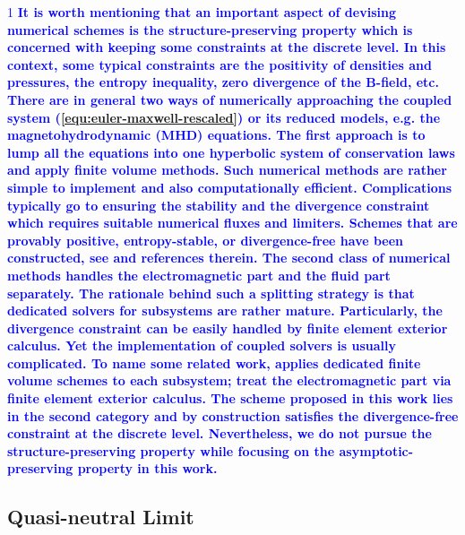 \documentclass{article}
\def\ifUpdate{1}
\newcommand{\review}[1]{\textcolor{blue}{\if\ifUpdate1\textbf{#1}\fi}}
\begin{document}
\review{
It is worth mentioning that an important aspect of devising numerical schemes is the structure-preserving property which is concerned with keeping some constraints at the discrete level. In this context, some typical constraints are the positivity of densities and pressures, the entropy inequality, zero divergence of the $\mathbf{B}$-field, etc. There are in general two ways of numerically approaching the coupled system (\ref{equ:euler-maxwell-rescaled}) or its reduced models, e.g. the magnetohydrodynamic (MHD) equations. The first approach is to lump all the equations into one hyperbolic system of conservation laws and apply finite volume methods. Such numerical methods are rather simple to implement and also computationally efficient. Complications typically go to ensuring the stability and the divergence constraint which requires suitable numerical fluxes and limiters. Schemes that are provably positive, entropy-stable, or divergence-free have been constructed, see \cite{wu_2018, wu_2023a, wu_2023b, kumar_2011, fuchs_2009} and references therein. The second class of numerical methods handles the electromagnetic part and the fluid part separately. The rationale behind such a splitting strategy is that dedicated solvers for subsystems are rather mature. Particularly, the divergence constraint can be easily handled by finite element exterior calculus. Yet the implementation of coupled solvers is usually complicated. To name some related work, \cite{fuchs_2009} applies dedicated finite volume schemes to each subsystem; \cite{hu_2017, hiptmair_2018} treat the electromagnetic part via finite element exterior calculus. The scheme proposed in this work lies in the second category and by construction satisfies the divergence-free constraint at the discrete level. Nevertheless, we do not pursue the structure-preserving property while focusing on the asymptotic-preserving property in this work. 
}

\subsection{Quasi-neutral Limit}
\label{sec:quasi-neutral_limit}
\end{document}
